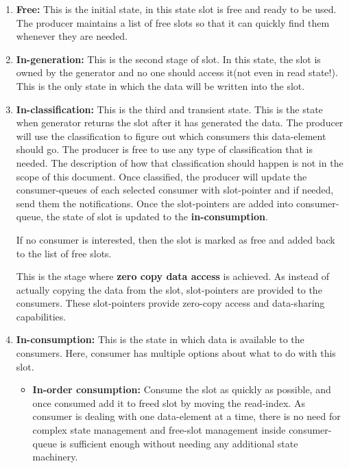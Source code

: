 \documentclass[a4paper,twoside]{report} %
\begin{document}
\begin{enumerate}
  \item \textbf{Free:} This is the initial state, in this state slot
  is free and ready to be used.  The producer maintains a list of free
  slots so that it can quickly find them whenever they are needed.

  \item \textbf{In-generation:} This is the second stage of slot. In
  this state, the slot is owned by the generator and no one should 
  access it(not even in read state!).  This is the only state in which
  the data will be written into the slot.

  \item \textbf{In-classification:} This is the third and transient
  state.  This is the state when generator returns the slot after it
  has generated the data.  The producer will use the classification to
  figure out which consumers this data-element should go.  The 
  producer is free to use any type of classification that is needed.
  The description of how that classification should happen is not in
  the scope of this document.  Once classified, the producer will 
  update the consumer-queues of each selected consumer with 
  slot-pointer and if needed, send them the notifications.  Once the 
  slot-pointers are added into consumer-queue, the state of slot is 
  updated to the \textbf{in-consumption}.
  
  If no consumer is interested, then the slot is marked as free and 
  added back to the list of free slots.


  This is the stage where \textbf{zero copy data access} is achieved.
  As instead of actually copying the data from the slot, slot-pointers
  are provided to the consumers.  These slot-pointers provide
  zero-copy access and data-sharing capabilities.


  \item \textbf{In-consumption:} This is the state in which data is
  available to the consumers.  Here, consumer has multiple options
  about what to do with this slot.
  \begin{itemize}
    \item \textbf{In-order consumption:} 
    Consume the slot as quickly as possible, and once consumed
    add it to freed slot by moving the read-index.  
    As consumer is dealing with one data-element at a time,
    there is no need for complex state management and 
    free-slot management inside consumer-queue is sufficient enough
    without needing any additional state machinery.



\end{itemize}
\end{enumerate}
\end{document}

